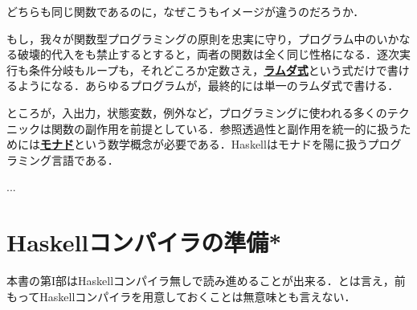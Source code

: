 \documentclass[a4paper,twocolumn]{jsbook}
\newcommand{\programminglanguage}[1]{\textsf{#1}}
\newcommand{\clang}{\programminglanguage{C}}
\newcommand{\clangkr}{\programminglanguage{K\&R~C}}
\newcommand{\haskell}{\programminglanguage{Haskell}}
\newcommand{\keyword}[1]{{\underline{\textbf{#1}}}}
\newcommand{\code}[1]{\texttt{#1}}
\newenvironment{ccode}{\begin{itembox}[r]{\clang}}{\end{itembox}}
\newenvironment{ckrcode}{\begin{itembox}[r]{\clangkr}}{\end{itembox}}
\begin{document}
どちらも同じ関数であるのに，なぜこうもイメージが違うのだろうか．

もし，我々が関数型プログラミングの原則を忠実に守り，プログラム中のいかなる破壊的代入をも禁止するとすると，両者の関数は全く同じ性格になる．逐次実行も条件分岐もループも，それどころか定数さえ，\keyword{ラムダ式}という式だけで書けるようになる．あらゆるプログラムが，最終的には単一のラムダ式で書ける．

ところが，入出力，状態変数，例外など，プログラミングに使われる多くのテクニックは関数の副作用を前提としている．参照透過性と副作用を統一的に扱うためには\keyword{モナド}という数学概念が必要である．\haskell はモナドを陽に扱うプログラミング言語である．

... %








\section{\haskell コンパイラの準備*}

本書の第I部は\haskell コンパイラ無しで読み進めることが出来る．とは言え，前もって\haskell コンパイラを用意しておくことは無意味とも言えない．
\end{document}
